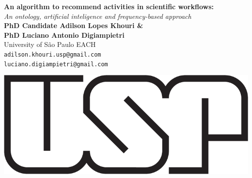\documentclass[40pt, a0, portrait]{a0poster}
\begin{document}


\begin{minipage}[b]{0.8\linewidth}
\veryHuge \color{NavyBlue} \textbf{An algorithm to recommend activities in scientific workflows:} \color{Black}\\ %
\Huge\textit{An ontology, artificial inteligence and frequency-based approach}\\[2cm] %
\huge \textbf{PhD Candidate Adilson Lopes Khouri \& \\  PhD Luciano Antonio Digiampietri}\\[0.5cm] %
\huge University of São Paulo EACH\\[0.4cm] %
\Large \texttt{adilson.khouri.usp@gmail.com} \\
\Large \texttt{luciano.digiampietri@gmail.com}
\end{minipage}
\begin{minipage}[b]{0.20\linewidth}
\includegraphics[width=15cm]{usp.png}\\
\end{minipage}

\vspace{1cm} %

\end{document}
